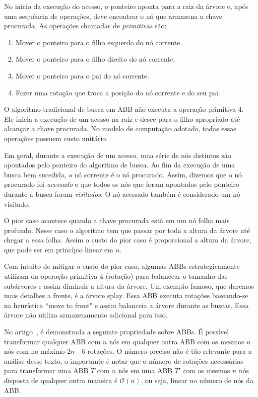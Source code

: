 No início da execução do acesso, o ponteiro aponta para a raiz da árvore e, após uma sequência de operações, deve encontrar o nó que armazena a chave procurada. As operações chamadas de \textit{primitivas} são:
\begin{enumerate}
    \item Mover o ponteiro para o filho esquerdo do nó corrente.
    \item Mover o ponteiro para o filho direito do nó corrente.
    \item Mover o ponteiro para o pai do nó corrente.
    \item Fazer uma rotação que troca a posição do nó corrente e do seu pai.
\end{enumerate}

O algoritmo tradicional de busca em ABB não executa a operação primitiva 4. Ele inicia a execução de um acesso na raiz e desce para o filho apropriado até alcançar a chave procurada. No modelo de computação adotado, todas essas operações possuem custo unitário.

Em geral, durante a execução de um acesso, uma série de nós distintos são apontados pelo ponteiro do algoritmo de busca. Ao fim da execução de uma busca bem sucedida, o nó corrente é o nó procurado. Assim, dizemos que o nó procurado foi \textit{acessado} e que todos os nós que foram apontados pelo ponteiro durante a busca foram \textit{visitados}. O nó acessado também é considerado um nó visitado.

O pior caso acontece quando a chave procurada está em um nó folha mais profundo. Nesse caso o algoritmo tem que passar por toda a altura da árvore até chegar a essa folha. Assim o custo do pior caso é proporcional a altura da árvore, que pode ser em princípio linear em $n$.

Com intuito de mitigar o custo do pior caso, algumas ABBs estrategicamente utilizam da operação primitiva 4 (rotação) para balancear o tamanho das subárvores e assim diminuir a altura da árvore. Um exemplo famoso, que daremos mais detalhes a frente, é a árvore splay. Essa ABB executa rotações baseando-se na heurística ``move to front" e assim balanceia a árvore durante as buscas. Essa árvore não utiliza armazenamento adicional para isso.

No artigo~\cite{rotation_distance}, é demonstrada a seguinte propriedade sobre ABBs. É possível transformar qualquer ABB com $n$ nós em qualquer outra ABB com os mesmos $n$ nós com no máximo $2n$ - 6 rotações. O número preciso não é tão relevante para a análise desse texto, o importante é notar que o número de rotações necessárias para transformar uma ABB $T$ com $n$ nós em uma ABB $T'$ com os mesmos $n$ nós disposta de qualquer outra maneira é \( \mathcal{O}(n) \), ou seja, linear no número de nós da ABB.


